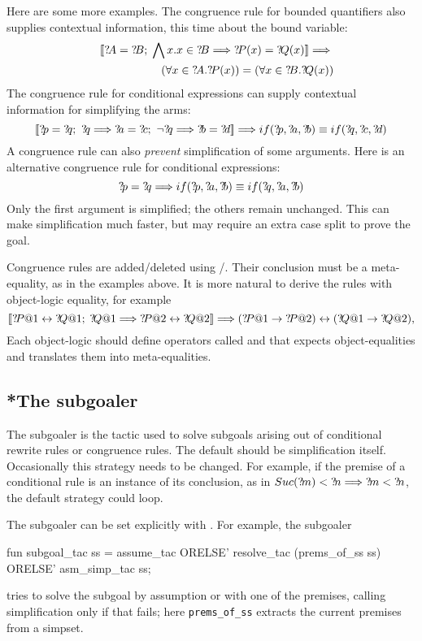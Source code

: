 Here are some more examples.  The congruence rule for bounded quantifiers
also supplies contextual information, this time about the bound variable:
\begin{eqnarray*}
  &&\List{\Var{A}=\Var{B};\; 
          \Forall x. x\in \Var{B} \Imp \Var{P}(x) = \Var{Q}(x)} \Imp{} \\
 &&\qquad\qquad
    (\forall x\in \Var{A}.\Var{P}(x)) = (\forall x\in \Var{B}.\Var{Q}(x))
\end{eqnarray*}
The congruence rule for conditional expressions can supply contextual
information for simplifying the arms:
\[ \List{\Var{p}=\Var{q};~ \Var{q} \Imp \Var{a}=\Var{c};~
         \neg\Var{q} \Imp \Var{b}=\Var{d}} \Imp
   if(\Var{p},\Var{a},\Var{b}) \equiv if(\Var{q},\Var{c},\Var{d})
\]
A congruence rule can also {\em prevent\/} simplification of some arguments.
Here is an alternative congruence rule for conditional expressions:
\[ \Var{p}=\Var{q} \Imp
   if(\Var{p},\Var{a},\Var{b}) \equiv if(\Var{q},\Var{a},\Var{b})
\]
Only the first argument is simplified; the others remain unchanged.
This can make simplification much faster, but may require an extra case split
to prove the goal.  

Congruence rules are added/deleted using 
/.  
Their conclusion must be a meta-equality, as in the examples above.  It is more
natural to derive the rules with object-logic equality, for example
\[ \List{\Var{P@1} \bimp \Var{Q@1};\; \Var{Q@1} \Imp \Var{P@2} \bimp \Var{Q@2}}
   \Imp (\Var{P@1} \imp \Var{P@2}) \bimp (\Var{Q@1} \imp \Var{Q@2}),
\]
Each object-logic should define operators called  and 
 that expects object-equalities and translates them into 
meta-equalities.

\subsection{*The subgoaler}
The subgoaler is the tactic used to solve subgoals arising out of
conditional rewrite rules or congruence rules.  The default should be
simplification itself.  Occasionally this strategy needs to be changed.  For
example, if the premise of a conditional rule is an instance of its
conclusion, as in $Suc({?\!m}) < {?\!n} \Longrightarrow {?\!m} < {?\!n}$, the
default strategy could loop.

The subgoaler can be set explicitly with .  For
example, the subgoaler
\begin{ttbox}
fun subgoal_tac ss = assume_tac ORELSE'
                     resolve_tac (prems_of_ss ss) ORELSE' 
                     asm_simp_tac ss;
\end{ttbox}
tries to solve the subgoal by assumption or with one of the premises, calling
simplification only if that fails; here {\tt prems_of_ss} extracts the
current premises from a simpset.


